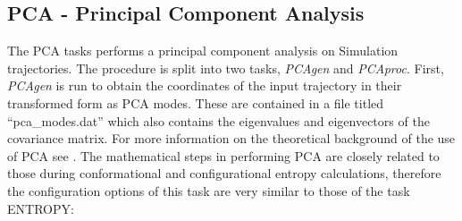 \documentclass[10pt,a4paper]{article} %
\begin{document}
	\subsection{PCA - Principal Component Analysis}
	The \acl{PCA} tasks performs a principal component analysis on Simulation trajectories. The procedure is split into two tasks, \textit{PCAgen} and \textit{PCAproc}. First, \textit{PCAgen} is run to obtain the coordinates of the input trajectory in their transformed form as \ac{PCA} modes. These are contained in a file titled ``pca\_modes.dat'' which also contains the eigenvalues and eigenvectors of the covariance matrix. For more information on the theoretical background of the use of \ac{PCA} see \cite{pca_review, pca_review2, dpca1, dpca2, dpca3}. The mathematical steps in performing \ac{PCA} are closely related to those during conformational and configurational entropy calculations, therefore the configuration options of this task are very similar to those of the task ENTROPY:
	
\end{document}
